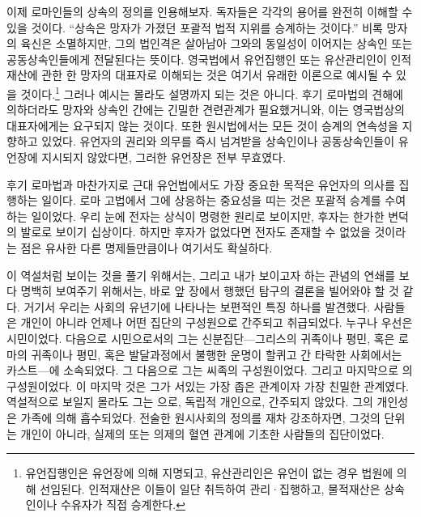이제 로마인들의 상속의 정의를 인용해보자.
독자들은 각각의 용어를 완전히 이해할 수 있을 것이다.
``상속은 망자가 가졌던 포괄적 법적 지위를 승계하는 것이다.''
비록 망자의 육신은 소멸하지만,
그의 법인격은 살아남아 그와의 동일성이
이어지는 상속인 또는 공동상속인들에게
전달된다는 뜻이다.
영국법에서 유언집행인 또는
유산관리인이
인적재산에 관한 한 망자의 대표자로 이해되는 것은
여기서 유래한 이론으로 예시될 수 있을 것이다.\footnote{유언집행인은
유언장에 의해 지명되고, 유산관리인은 유언이 없는 경우 법원에 의해
선임된다. 인적재산은 이들이 일단 취득하여 관리^^b7집행하고,
물적재산은 상속인이나 수유자가 직접 승계한다.}
그러나 예시는 몰라도 설명까지 되는 것은 아니다.
후기 로마법의 견해에 의하더라도
망자와 상속인 간에는 긴밀한 견련관계가 필요했거니와,
이는 영국법상의 대표자에게는 요구되지 않는 것이다.
또한 원시법에서는 모든 것이 승계의 연속성을 지향하고 있었다.
유언자의 권리와 의무를 즉시 넘겨받을 상속인이나 공동상속인들이
유언장에
지시되지 않았다면,
그러한 유언장은 전부 무효였다.

후기 로마법과 마찬가지로 근대 유언법에서도
가장 중요한 목적은 유언자의 의사를 집행하는 일이다.
로마 고법에서 그에 상응하는 중요성을 띠는 것은
포괄적 승계를 수여하는 일이었다.
우리 눈에 전자는 상식이 명령한 원리로 보이지만,
후자는 한가한 변덕의 발로로 보이기 십상이다.
하지만 후자가 없었다면 전자도 존재할 수 없었을 것이라는 점은
유사한 다른 명제들만큼이나 여기서도 확실하다.

이 역설처럼 보이는 것을 풀기 위해서는,
그리고 내가 보이고자 하는 관념의 연쇄를 보다 명백히 보여주기 위해서는,
바로 앞 장에서 행했던 탐구의 결론을 빌어와야 할 것 같다.
거기서 우리는 사회의 유년기에 나타나는 보편적인 특징 하나를 발견했다.
사람들은 개인이 아니라 언제나 어떤 집단의 구성원으로
간주되고 취급되었다.
누구나 우선은 시민이었다.
다음으로 시민으로서의 그는
신분집단---그리스의 귀족이나 평민,
혹은 로마의 귀족이나 평민,
혹은 발달과정에서 불행한 운명이 할퀴고 간 타락한 사회에서는
카스트---에 소속되었다.
그 다음으로 그는 씨족의 구성원이었다.
그리고 마지막으로 의 구성원이었다.
이 마지막 것은 그가 서있는 가장 좁은 관계이자 가장 친밀한 관계였다.
역설적으로 보일지 몰라도 그는 으로,
독립적 개인으로, 간주되지 않았다.
그의 개인성은 가족에 의해 흡수되었다.
전술한 원시사회의 정의를 재차 강조하자면,
그것의 단위는 개인이 아니라,
실제의 또는 의제의 혈연 관계에 기초한 사람들의 집단이었다.

